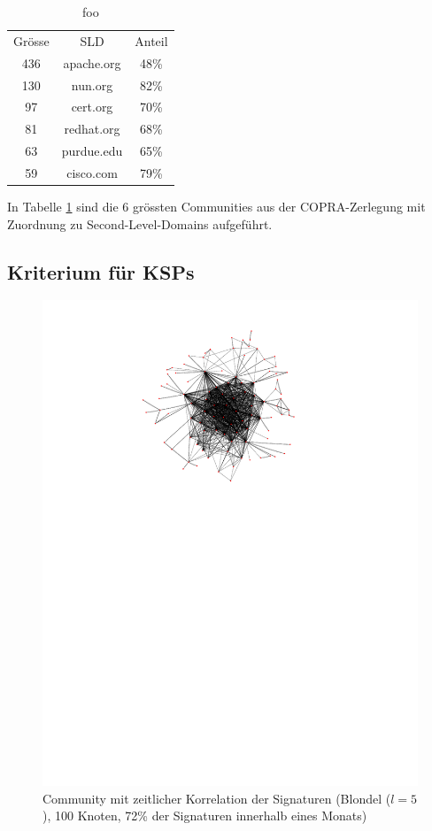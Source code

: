 \begin{table}
  \centering
  \begin{tabular}{c|c|c}
    Gr\"osse & SLD & Anteil \\
    436 & apache.org & 48\% \\
    130 & nun.org & 82\% \\
    97 & cert.org & 70\% \\
    81 & redhat.org & 68\% \\
    63 & purdue.edu & 65\% \\
    59 & cisco.com & 79\% 
  \end{tabular}
  \caption{foo}
  \label{tab:ass-examples}
\end{table}
In Tabelle \ref{tab:ass-examples} sind die 6 gr\"ossten Communities
aus der COPRA-Zerlegung mit Zuordnung zu Second-Level-Domains
aufgef\"uhrt.

\subsection{Kriterium f\"ur KSPs}
\label{sec:kriterium-fur-ksps}

\begin{figure}[th!]
  \centering
  \includegraphics[scale=1.5]{images/subgraph-label-time-fa62cc57cd35e9f90b85435efc407ad5.pdf}
  \caption{Community mit zeitlicher Korrelation der Signaturen
    (Blondel ($l=5$),
    100 Knoten, 72\% der Signaturen innerhalb eines Monats)}
  \label{fig:time-corr-com-normal}
\end{figure}

